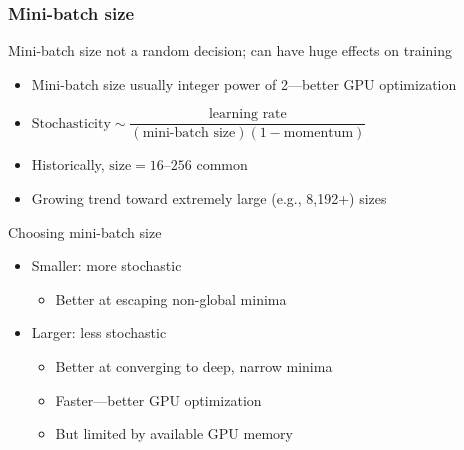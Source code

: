 \begin{frame}
    \frametitle{Mini-batch size}

    Mini-batch size not a random decision; can have huge effects on training
    \begin{itemize}
        \item Mini-batch size usually integer power of 2---better GPU optimization
        \item $\text{Stochasticity} \sim \dfrac{\text{learning rate}}{(\text{mini-batch size}) (1 - \text{momentum})}$ \citep{SmithNIPS17}
        \item Historically, $\text{size} = 16 \text{--} 256$ common
        \item Growing trend toward extremely large (e.g., 8,192+) sizes
    \end{itemize}
    \pause

    Choosing mini-batch size
    \begin{itemize}
        \item Smaller: more stochastic
        \begin{itemize}
            \item Better at escaping non-global minima
        \end{itemize}
        \item Larger: less stochastic
        \begin{itemize}
            \item Better at converging to deep, narrow minima
            \item Faster---better GPU optimization
            \item But limited by available GPU memory
        \end{itemize}
    \end{itemize}
\end{frame}


